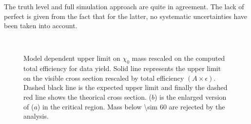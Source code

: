 The truth level and full simulation approach are quite in agreement. The lack of perfect is given from the fact that for the latter, no systematic uncertainties have been taken into account.



\begin{figure}[tp]
\centering
{} \\
 \quad
\caption{Model dependent upper limit on $\chi_0$ mass rescaled on the computed total efficiency for data yield. Solid line represents the upper limit on the visible cross section rescaled by total efficiency $\left(A\times\epsilon\right)$. Dashed black line is the expected upper limit and finally the dashed red line shows the theorical cross section. ($b$) is the enlarged version of ($a$) in the critical region. Mass below \SI{\sim 60}{\gev} are rejected by the analysis.}
\label{fig:exclMI}
\end{figure}











